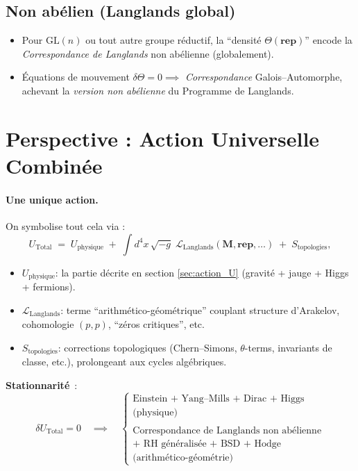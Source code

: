 \documentclass[11pt]{article}
\begin{document}
\subsection{Non abélien (Langlands global)}
\begin{itemize}
  \item Pour \(\mathrm{GL}(n)\) ou tout autre groupe réductif, la “densité \(\Theta(\mathbf{rep})\)” encode la \emph{Correspondance de Langlands} non abélienne (globalement). 
  \item Équations de mouvement \(\delta \Theta = 0 \implies\) \emph{Correspondance} Galois--Automorphe, achevant la \emph{version non abélienne} du Programme de Langlands.
\end{itemize}

\section{Perspective : Action Universelle Combinée}
\label{sec:universal_combined}

\paragraph{Une unique action.}
On symbolise tout cela via :
\[
U_{\mathrm{Total}}
\;=\;
U_{\mathrm{physique}}
\;+\;
\int\! d^4x\,\sqrt{-g}\;\mathcal{L}_{\mathrm{Langlands}}(\mathbf{M},\mathbf{rep},\ldots)
\;+\;
S_{\mathrm{topologies}},
\]
\begin{itemize}
  \item \textbf{$U_{\mathrm{physique}}$}: la partie décrite en section \ref{sec:action_U} (gravité + jauge + Higgs + fermions).
  \item \textbf{$\mathcal{L}_{\mathrm{Langlands}}$}: terme “arithmético-géométrique” couplant structure d'Arakelov, cohomologie \((p,p)\), “zéros critiques”, etc.
  \item \textbf{$S_{\mathrm{topologies}}$}: corrections topologiques (Chern--Simons, $\theta$-terms, invariants de classe, etc.), prolongeant aux cycles algébriques.
\end{itemize}

\noindent
\textbf{Stationnarité}~:
\[
  \delta U_{\mathrm{Total}} = 0
  \quad \implies \quad
  \begin{cases}
    \text{Einstein + Yang--Mills + Dirac + Higgs} \\
    \text{(physique)} \\
    \\
    \text{Correspondance de Langlands non abélienne} \\
    \text{+ RH généralisée + BSD + Hodge} \\
    \text{(arithmético-géométrie)}
  \end{cases}
\]
\smallskip
\end{document}
